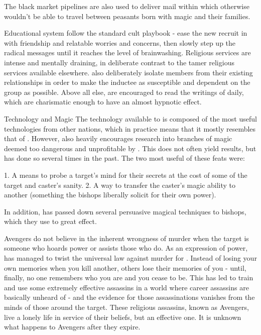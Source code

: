\documentclass[blue]{GL2020}
\begin{document}
The black market pipelines are also used to deliver mail within \pFarm{} which otherwise wouldn't be able to travel between peasants born with magic and their families.


Educational system
\pCult{} follow the standard cult playbook - ease the new recruit in with friendship and relatable worries and concerns, then slowly step up the radical messages until it reaches the level of brainwashing. Religious services are intense and mentally draining, in deliberate contrast to the tamer religious services available elsewhere. \pCult{} also deliberately isolate members from their existing relationships in order to make the inductee as susceptible and dependent on the group as possible. Above all else, \pCult{} are encouraged to read the writings of \cCultLeader{} daily, which are charismatic enough to have an almost hypnotic effect.

Technology and Magic
The technology available to \pCult{} is composed of the most useful technologies from other nations, which in practice means that it mostly resembles that of \pTech{}. However, \pCult{} also heavily encourages research into branches of magic deemed too dangerous and unprofitable by \pTech{}. This does not often yield results, but has done so several times in the past. The two most useful of these feats were: 

1. A means to probe a target's mind for their secrets at the cost of some of the target and caster's sanity. 
2. A way to transfer the caster's magic ability to another (something the bishops liberally solicit for their own power).

In addition, \cCultLeader{} has passed down several persuasive magical techniques to bishops, which they use to great effect.

Avengers
\pCult{} do not believe in the inherent wrongness of murder when the target is someone who hoards power or assists those who do. As an expression of power, \cCultGod{} has managed to twist the universal law against murder for \pCult{}. Instead of losing your own memories when you kill another, others lose their memories of you - until, finally, no one remembers who you are and you cease to be. This has led \pCult{} to train and use some extremely effective assassins in a world where career assassins are basically unheard of - and the evidence for those assassinations vanishes from the minds of those around the target. These religious assassins, known as Avengers, live a lonely life in service of their beliefs, but an effective one. It is unknown what happens to Avengers after they expire.
\end{document}
